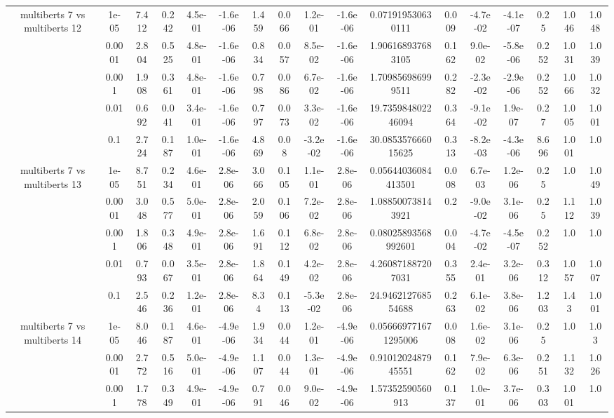 \begin{tabular}{|c|c|c|c|c|c|c|c|c|c|c|c|c|c|c|c|c|}
\hline
\multirow{5}{*}{multiberts 7 vs multiberts 12} & 1e-05 & 7.412 & 0.242 & 4.5e-01 & -1.6e-06 & 1.459 & 0.066 & 1.2e-01 & -1.6e-06 & 0.071919530630111 & 0.009 & -4.7e-02 & -4.1e-07 & 0.25 & 1.046 & 1.048 \\
 & 0.0001 & 2.804 & 0.525 & 4.8e-01 & -1.6e-06 & 0.834 & 0.057 & 8.5e-02 & -1.6e-06 & 1.906168937683105 & 0.162 & 9.0e-02 & -5.8e-06 & 0.252 & 1.031 & 1.039 \\
 & 0.001 & 1.908 & 0.361 & 4.8e-01 & -1.6e-06 & 0.798 & 0.086 & 6.7e-02 & -1.6e-06 & 1.709856986999511 & 0.282 & -2.3e-02 & -2.9e-06 & 0.252 & 1.066 & 1.032 \\
 & 0.01 & 0.692 & 0.041 & 3.4e-01 & -1.6e-06 & 0.797 & 0.073 & 3.3e-02 & -1.6e-06 & 19.735984802246094 & 0.364 & -9.1e-02 & 1.9e-07 & 0.27 & 1.005 & 1.001 \\
 & 0.1 & 2.724 & 0.187 & 1.0e-01 & -1.6e-06 & 4.869 & 0.08 & -3.2e-02 & -1.6e-06 & 30.085357666015625 & 0.313 & -8.2e-03 & -4.3e-06 & 8.696 & 1.001 & 1.0 \\
\hline
\multirow{5}{*}{multiberts 7 vs multiberts 13} & 1e-05 & 8.751 & 0.234 & 4.6e-01 & 2.8e-06 & 3.066 & 0.105 & 1.1e-01 & 2.8e-06 & 0.05644036084413501 & 0.008 & 6.7e-03 & 1.2e-06 & 0.25 & 1.0 & 1.049 \\
 & 0.0001 & 3.048 & 0.577 & 5.0e-01 & 2.8e-06 & 2.059 & 0.106 & 7.2e-02 & 2.8e-06 & 1.088500738143921 & 0.2 & -9.0e-02 & 3.1e-06 & 0.25 & 1.112 & 1.039 \\
 & 0.001 & 1.806 & 0.348 & 4.9e-01 & 2.8e-06 & 1.691 & 0.112 & 6.8e-02 & 2.8e-06 & 0.08025893568992601 & 0.004 & -4.7e-02 & -4.5e-07 & 0.252 & 1.0 & 1.0 \\
 & 0.01 & 0.793 & 0.067 & 3.5e-01 & 2.8e-06 & 1.864 & 0.149 & 4.2e-02 & 2.8e-06 & 4.260871887207031 & 0.355 & 2.4e-01 & 3.2e-06 & 0.312 & 1.057 & 1.007 \\
 & 0.1 & 2.546 & 0.236 & 1.2e-01 & 2.8e-06 & 8.34 & 0.113 & -5.3e-02 & 2.8e-06 & 24.946212768554688 & 0.263 & 6.1e-02 & 3.8e-06 & 1.203 & 1.43 & 1.001 \\
\hline
\multirow{5}{*}{multiberts 7 vs multiberts 14} & 1e-05 & 8.046 & 0.187 & 4.6e-01 & -4.9e-06 & 1.934 & 0.044 & 1.2e-01 & -4.9e-06 & 0.056669771671295006 & 0.008 & 1.6e-02 & 3.1e-06 & 0.25 & 1.0 & 1.03 \\
 & 0.0001 & 2.772 & 0.516 & 5.0e-01 & -4.9e-06 & 1.107 & 0.044 & 1.3e-01 & -4.9e-06 & 0.9101202487945551 & 0.162 & 7.9e-02 & 6.3e-06 & 0.251 & 1.132 & 1.026 \\
 & 0.001 & 1.778 & 0.349 & 4.9e-01 & -4.9e-06 & 0.791 & 0.046 & 9.0e-02 & -4.9e-06 & 1.57352590560913 & 0.137 & 1.0e-01 & 3.7e-06 & 0.303 & 1.001 & 1.0 \\

\end{tabular}
